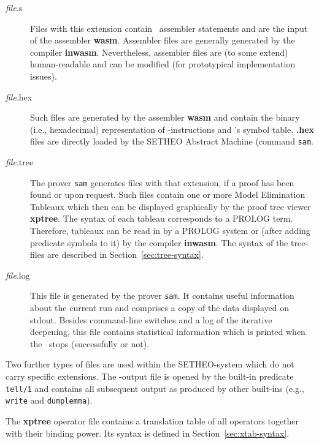 \begin{description}
\item[{\em file}.s]
Files with this extension contain \SAM\ assembler statements and
are the input of the assembler {\bf wasm}.
Assembler files are generally generated by the compiler {\bf inwasm}.
Nevertheless, assembler files are (to some extend) human-readable
and can be modified (for prototypical implementation issues).

\item[{\em file}.hex]
Such files are generated by the assembler {\bf wasm} and contain the
binary (i.e., hexadecimal) representation of \SAM-instructions and
\SAM's symbol table. {\bf .hex} files are directly loaded by the
SETHEO Abstract Machine \SAM (command {\tt sam}.

\item[{\em file}.tree]
The prover {\tt sam} generates files with that extension,
if a proof has been found or upon request. Such files contain
one or more Model Elimination Tableaux which then can be displayed
graphically by the proof tree viewer {\bf xptree}.
The syntax of each tableau corresponds to a PROLOG term. Therefore,
tableaux can be read in by a PROLOG system or (after adding
predicate symbols to it) by the compiler {\bf inwasm}.
The syntax of the tree-files are described in Section~\ref{sec:tree-syntax}.
\item[{\em file}.log]
This file is generated by the prover {\tt sam}. It contains useful
information about the current run and comprises
a copy of the data displayed on stdout.
Besides command-line switches and a log of the iterative deepening, this
file contains statistical information which is printed when the
\SAM\ stops (successfully or not).
\end{description}


Two further types of files are used within the SETHEO-system which
do not carry specific extensions.
The \SAM-output file is opened by the built-in predicate {\tt tell/1}
and contains all subsequent output as produced by other built-ins
(e.g., {\tt write} and {\tt dumplemma}).

The {\bf xptree} operator file contains  a translation table
of all operators together with their binding power. Its syntax is
defined in Section~\ref{sec:xtab-syntax}.
